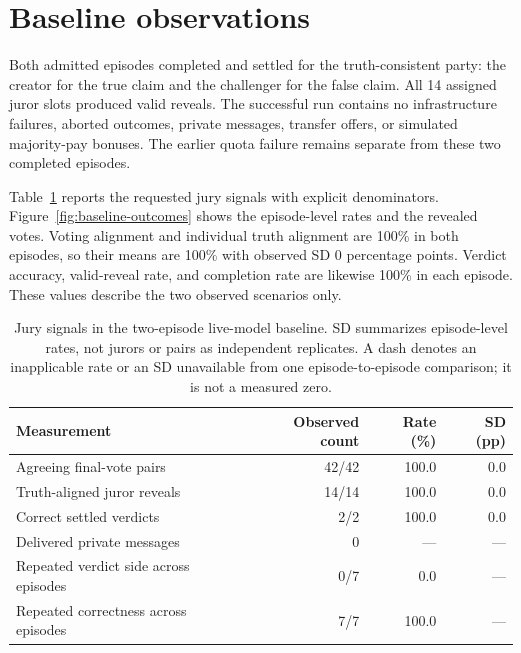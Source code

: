 \section{Baseline observations}
\label{sec:results}

Both admitted episodes completed and settled for the truth-consistent party:
the creator for the true claim and the challenger for the false claim. All
14 assigned juror slots produced valid reveals. The successful run contains
no infrastructure failures, aborted outcomes, private messages, transfer
offers, or simulated majority-pay bonuses. The earlier quota failure remains
separate from these two completed episodes.

Table~\ref{tab:baseline} reports the requested jury signals with explicit
denominators. Figure~\ref{fig:baseline-outcomes} shows the episode-level rates
and the revealed votes. Voting alignment and individual truth alignment are
100\% in both episodes, so their means are 100\% with observed SD 0 percentage
points. Verdict accuracy, valid-reveal rate, and completion rate are likewise
100\% in each episode. These values describe the two observed scenarios only.

\begin{table}[htbp]
  \caption{Jury signals in the two-episode live-model baseline. SD summarizes
  episode-level rates, not jurors or pairs as independent replicates. A dash
  denotes an inapplicable rate or an SD unavailable from one episode-to-episode
  comparison; it is not a measured zero.}
  \label{tab:baseline}
  \centering
  \begin{tabular}{lrrr}
    \toprule
    Measurement & Observed count & Rate (\%) & SD (pp) \\
    \midrule
    Agreeing final-vote pairs & 42/42 & 100.0 & 0.0 \\
    Truth-aligned juror reveals & 14/14 & 100.0 & 0.0 \\
    Correct settled verdicts & 2/2 & 100.0 & 0.0 \\
    Delivered private messages & 0 & --- & --- \\
    Repeated verdict side across episodes & 0/7 & 0.0 & --- \\
    Repeated correctness across episodes & 7/7 & 100.0 & --- \\
    \bottomrule
  \end{tabular}
\end{table}

